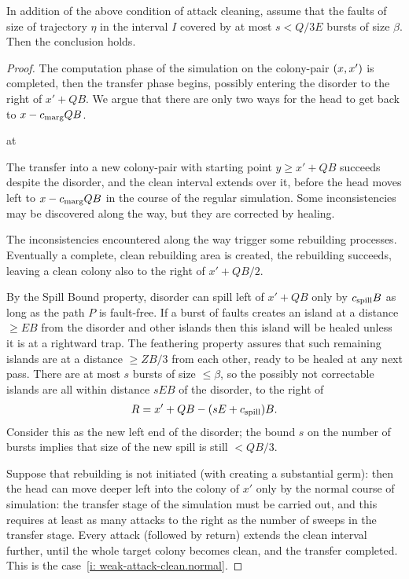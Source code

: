 \documentclass[11pt]{memoir}
\theoremstyle{definition} %
\renewcommand{\le}{\leq}
\renewcommand{\ge}{\geq}
\def\B{B}
\newcommand{\E}{E} %
\newcommand{\Q}{Q} %
\newcommand{\s}{s} %
\newcommand{\Z}{Z} %
\newcommand{\cns}[1]{c_{\textrm{\upshape #1}}}
\newcommand{\CMarg}{\cns{marg}}
\newcommand{\CSpill}{\cns{spill}}
\begin{document}
 \begin{lemma}\label{lem:weak-attack-clean}
   In addition of the above condition of attack cleaning,
   assume that the faults of size of trajectory \( \eta \) in the interval
   \( I \) covered by at most \( \s<\Q/3\E \) bursts of size \( \beta \).
   Then the conclusion holds.
\end{lemma}
\begin{proof}
The computation phase of the simulation on the colony-pair \( (x,x') \) is completed,
then the transfer phase begins, possibly entering the disorder to the right of \( x'+\Q\B \).
We argue that there are only two ways for the head to get back to \( x-\CMarg\Q\B \).
\begin{varenum}{at}
\item\label{i: weak-attack-clean.normal} The transfer into a new colony-pair with starting point
\( y\ge x'+\Q\B \) succeeds despite the disorder, and the clean interval extends over it, before
the head moves left to \( x-\CMarg\Q\B \) in the course of the regular simulation.
Some inconsistencies may be discovered along the way, but they are corrected by healing.

\item\label{i: weak-attack-clean.rebuild} The inconsistencies encountered along the way trigger some
rebuilding processes.
Eventually a complete, clean rebuilding area is created, the rebuilding succeeds, leaving a clean
colony also to the right of \( x'+\Q\B/2 \).
\end{varenum}

By the Spill Bound property, disorder can spill left of \( x'+\Q\B \) only by
\( \CSpill\B \) as long as the path \( P \) is fault-free.
If a burst of faults creates an island at a distance \( \ge\E\B \) from the disorder and other islands
then this island will be healed unless it is at a rightward trap.
The feathering property assures that such remaining islands are at a distance \( \ge\Z\B/3 \) from
each other, ready to be healed at any next pass.
There are at most \( \s \) bursts of size \( \le\beta \),
so the possibly not correctable islands are all
within distance \( \s\E\B \) of the disorder, to the right of
\begin{align*}
   R = x'+\Q\B -(\s\E+\CSpill)\B.
\end{align*}
Consider this as the new left end of the disorder; the bound \( \s \) on the number of bursts
implies that size of the new spill is still \( <\Q\B/3 \).

Suppose that rebuilding is not initiated (with creating a substantial germ):
then the head can move deeper left into the colony of \( x' \) only by the normal
course of simulation: the transfer stage of the simulation must be carried out, and this requires 
at least as many attacks to the right as the number of sweeps in the transfer stage.
Every attack (followed by return) extends the clean interval further,
until the whole target colony becomes clean, and the transfer completed.
This is the case~\eqref{i: weak-attack-clean.normal}.


\end{proof}
\end{document}
